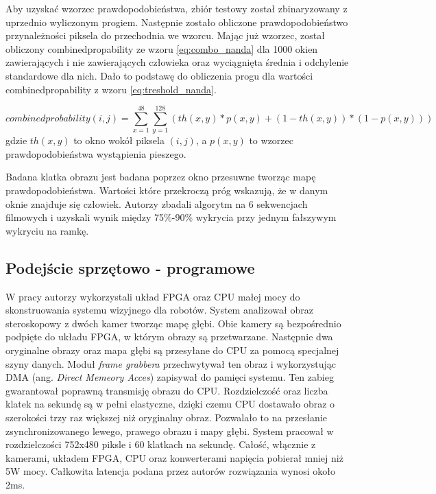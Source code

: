 Aby uzyskać wzorzec prawdopodobieństwa, zbiór testowy został zbinaryzowany z uprzednio wyliczonym progiem. 
Następnie zostało obliczone prawdopodobieństwo przynależności piksela do przechodnia we wzorcu. %
Mając już wzorzec, został obliczony combinedpropability ze wzoru \eqref{eq:combo_nanda} dla 1000 okien zawierających i nie zawierających człowieka oraz wyciągnięta średnia i odchylenie standardowe dla nich. %
Dało to podstawę do obliczenia progu dla wartości combinedpropability z wzoru \eqref{eq:treshold_nanda}. 

\begin{equation} \label{eq:combo_nanda} combinedprobability(i,j)=\sum_{x=1}^{48}\sum_{y=1}^{128}(th(x,y)*p(x,y)+(1-th(x,y))*(1-p(x,y)))\end{equation}
\noindent
gdzie \(th(x,y)\) to okno wokół piksela \((i,j)\), a \(p(x,y)\) to wzorzec prawdopodobieństwa wystąpienia pieszego.

Badana klatka obrazu jest badana poprzez okno przesuwne tworząc mapę prawdopodobieństwa. %
Wartości które przekroczą próg wskazują, że w danym oknie znajduje się człowiek. %
Autorzy zbadali algorytm na 6 sekwencjach filmowych i uzyskali wynik między 75\%-90\% wykrycia przy jednym fałszywym wykryciu na ramkę. %



\subsection{Podejście sprzętowo - programowe}

W pracy \cite{honegger2014real} autorzy wykorzystali układ FPGA oraz CPU małej mocy do skonstruowania systemu wizyjnego dla robotów. 
System analizował obraz steroskopowy z dwóch kamer tworząc mapę głębi. %
Obie kamery są bezpośrednio podpięte do układu FPGA, w którym obrazy są przetwarzane. %
Następnie dwa oryginalne obrazy oraz mapa głębi są przesyłane do CPU za pomocą specjalnej szyny danych. %
Moduł \textit{frame grabbera} przechwytywał ten obraz i wykorzystując DMA (ang. \textit{Direct Memeory Acces}) zapisywał do pamięci systemu. 
Ten zabieg gwarantował poprawną transmisję obrazu do CPU. 
Rozdzielczość oraz liczba klatek na sekundę są w pełni elastyczne, dzięki czemu CPU dostawało obraz o szerokości trzy raz większej niż oryginalny obraz.
Pozwalało to na przesłanie zsynchronizowanego lewego, prawego obrazu i mapy głębi. 
System pracował w rozdzielczości 752x480 piksle i 60 klatkach na sekundę. 
Całość, włącznie z kamerami, układem FPGA, CPU oraz konwerterami napięcia pobierał mniej niż 5W mocy. 
Całkowita latencja podana przez autorów rozwiązania wynosi około 2ms.

